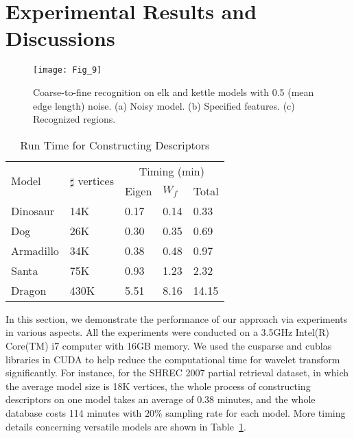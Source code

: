 \section{Experimental Results and Discussions}
\label{sec:Exp}

\begin{figure}[!to]
\texttt{[image: Fig\_9]}
\caption[Coarse-to-fine recognition on elk and kettle models.]
  {Coarse-to-fine recognition on elk and kettle models with 0.5
  (mean edge length) noise. (a) Noisy model. (b) Specified features.
  (c) Recognized regions.}
\label{noise}
\end{figure}

\begin{table}
\centering
\caption{Run Time for Constructing Descriptors}
  \label{table:time}
  \renewcommand{\arraystretch}{1.3}
\begin{tabular}{p{}p{}p{}p{}p{}}
\hline
\multirow{2}{*}{Model} &
\multirow{2}{*}{$\sharp$ vertices} &
\multicolumn{3}{c}{Timing (min)} \\
\cline{3-5}
&\multicolumn{1}{c}{} & Eigen &  $W_f$ & Total\\
\hline
Dinosaur   & 14K & 0.17 & 0.14 & 0.33 \\
Dog       & 26K & 0.30 & 0.35 & 0.69 \\
Armadillo & 34K & 0.38 & 0.48 & 0.97 \\
Santa     & 75K & 0.93 & 1.23 & 2.32\\
Dragon & 430K & 5.51 & 8.16 & 14.15\\
\hline
\end{tabular}
\end{table}

In this section, we demonstrate the performance of our approach via
experiments in various aspects. All the experiments were conducted on
a 3.5GHz Intel(R) Core(TM) i7 computer with 16GB memory. We used the
cusparse and cublas libraries in CUDA to help reduce the computational
time for wavelet transform significantly. For instance, for the SHREC
2007 partial retrieval dataset, in which the average model size is 18K
vertices, the whole process of constructing descriptors on one model
takes an average of 0.38 minutes, and the whole database costs 114
minutes with $20\%$ sampling rate for each model. More timing details
concerning versatile models are shown in Table~\ref{table:time}.

